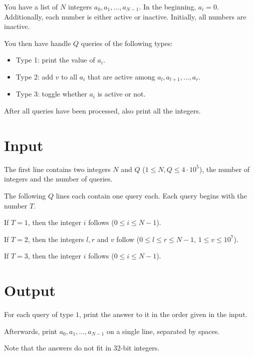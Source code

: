 
You have a list of $N$ integers $a_0, a_1, \dots, a_{N-1}$. In the beginning, $a_i=0$. Additionally, each number
is either active or inactive. Initially, all numbers are inactive.

You then have handle $Q$ queries of the following types:
\begin{itemize}
    \item Type 1: print the value of $a_i$.
    \item Type 2: add $v$ to all $a_i$ that are active among $a_l, a_{l+1}, \dots, a_{r}$.
    \item Type 3: toggle whether $a_i$ is active or not.
\end{itemize}

After all queries have been processed, also print all the integers.

\section*{Input}
The first line contains two integers $N$ and $Q$ ($1 \leq N, Q \leq 4 \cdot 10^5$),
the number of integers and the number of queries.

The following $Q$ lines each contain one query each. Each query begins with the number $T$.

If $T=1$, then the integer $i$ follows ($0 \leq i \leq N - 1$).

If $T=2$, then the integers $l, r$ and $v$ follow ($0 \leq l \leq r \leq N - 1$, $1 \leq v \leq 10^7$).

If $T=3$, then the integer $i$ follows ($0 \leq i \leq N - 1$).


\section*{Output}
For each query of type $1$, print the answer to it in the order given in the input.

Afterwards, print $a_0, a_1, \dots, a_{N-1}$ on a single line, separated by spaces.

Note that the answers do not fit in 32-bit integers.

